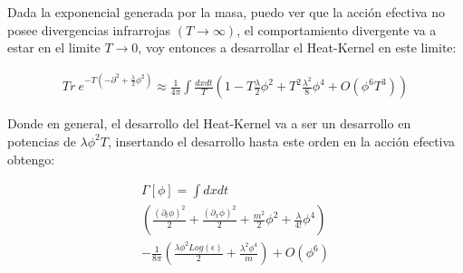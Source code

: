 Dada la exponencial generada por la masa, puedo ver que la acción efectiva no posee divergencias infrarrojas $(T \rightarrow \infty)$, el comportamiento divergente va a estar en el limite $T \rightarrow 0$, voy entonces a desarrollar el Heat-Kernel en este limite:



\begin{equation}
\begin{array}{c}
Tr \  e ^{- T ( - \partial ^2 + \frac{\lambda}{2} \phi ^2 ) } \approx
\frac{1}{4 \pi}
\int
\frac{  dx dt }{T}
\left(
1  -
T  \frac{\lambda}{2} \phi ^2  +
T ^2 \frac{\lambda ^2 }{8} \phi ^4 + O ( \phi ^6 T ^3)
\right)

\end{array}
\end{equation}

Donde en general, el desarrollo del Heat-Kernel va a ser un desarrollo en potencias de $ \lambda \phi ^2 T $, insertando el desarrollo hasta este orden en la acción efectiva obtengo:

\begin{comment}

\begin{equation}
\begin{array}{c}
\int _ { \epsilon } ^{\infty} \frac{ dt}{t} 
e ^{- t m ^2 }
Tr \  e ^{- t ( - \partial ^2 + \frac{\lambda}{2} \phi ^2 ) } = \\
\int _ { \epsilon } ^{1} \frac{ dt}{t} 
e ^{- t m ^2 }
Tr \  e ^{- t ( - \partial ^2 + \frac{\lambda}{2} \phi ^2 ) } + 
\int _ { 1 } ^{\infty} \frac{ dt}{t} 
Tr \  e ^{- t ( - \partial ^2 + m^2 + \frac{\lambda}{2} \phi ^2 ) }

\end{array}
\end{equation}

\end{comment}



\begin{equation}
\begin{array}{c}
\Gamma [ \phi ] = 
\int dx dt  \\
\left(
\frac{( \partial _t \phi ) ^2}{2} +  
\frac{( \partial _x \phi ) ^2}{2} +
\frac{m ^2 }{2} \phi ^2 +
\frac{\lambda}{4!} \phi ^4 
						\right)  \\
- \frac{1}{8 \pi}
\left(
	\frac{\lambda \phi ^2 Log( \epsilon )}{2}  + \frac{ \lambda ^2 \phi ^4 }{m}
	\right) + O ( \phi ^6)

\end{array}
\end{equation}

